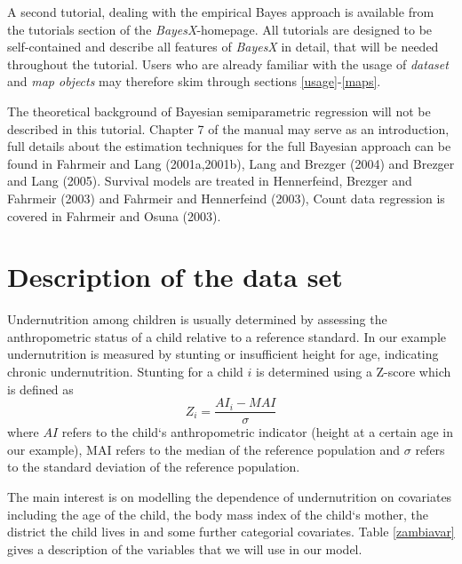 \documentclass{article}
\begin{document}
A second tutorial, dealing with the empirical Bayes approach is
available from the tutorials section of the {\it BayesX}-homepage.
All tutorials are designed to be self-contained and describe all
features of {\it BayesX} in detail, that will be needed throughout
the tutorial. Users who are already familiar with the usage of
{\it dataset} and {\it map objects} may therefore skim through
sections \ref{usage}-\ref{maps}.

The theoretical background of Bayesian semiparametric regression
will not be described in this tutorial. Chapter 7 of the manual may
serve as an introduction, full details about the estimation
techniques for the full Bayesian approach can be found in Fahrmeir
and Lang (2001a,2001b),\nocite{fahlan01a}\nocite{fahlan01b} Lang and
Brezger (2004) and Brezger and Lang
(2005).\nocite{lanbre04}\nocite{lanbre05} Survival models are
treated in Hennerfeind, Brezger and Fahrmeir (2003)\nocite{henfah03}
and Fahrmeir and Hennerfeind (2003)\nocite{fahhen03}, Count data
regression is covered in Fahrmeir and Osuna (2003)\nocite{fahosu03}.

\section{Description of the data set}

Undernutrition among children is usually determined by assessing
the anthropometric status of a child relative to a reference
standard. In our example undernutrition is measured by stunting or
insufficient height for age, indicating chronic undernutrition.
Stunting for a child $i$ is determined using a Z-score which is
defined as
\[Z_i = \frac{AI_i-MAI}{\sigma}\]
where $AI$ refers to the child`s anthropometric indicator (height
at a certain age in our example), MAI refers to the median of the
reference population and $\sigma$ refers to the standard deviation
of the reference population.

The main interest is on modelling the dependence of undernutrition
on covariates including the age of the child, the body mass index
of the child`s mother, the district the child lives in and some
further categorial covariates. Table \ref{zambiavar} gives a
description of the variables that we will use in our model.
\end{document}
